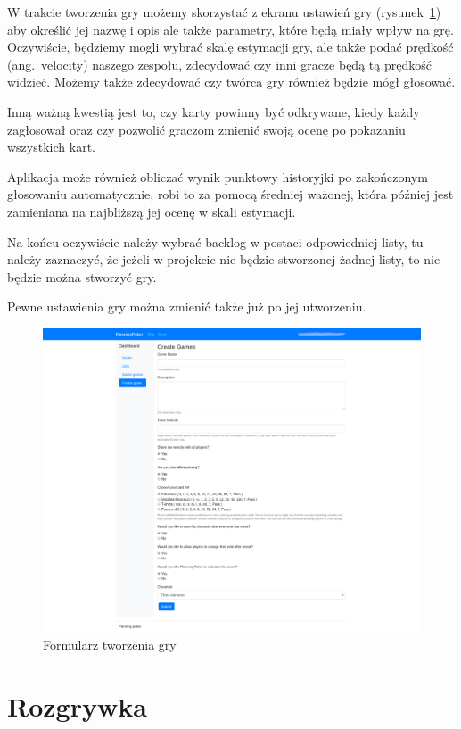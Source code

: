 W trakcie tworzenia gry możemy skorzystać z ekranu ustawień gry (rysunek~\ref{rys:form})
aby określić jej nazwę i opis ale także parametry, które będą miały wpływ na grę.
Oczywiście, będziemy mogli wybrać skalę estymacji gry, ale także podać prędkość (ang.\ velocity)
naszego zespołu, zdecydować czy inni gracze będą tą prędkość widzieć.
Możemy także zdecydować czy twórca gry również będzie mógł głosować.

Inną ważną kwestią jest to, czy karty powinny być odkrywane, kiedy każdy zagłosował
oraz czy pozwolić graczom zmienić swoją ocenę po pokazaniu wszystkich kart.

Aplikacja może również obliczać wynik punktowy historyjki po zakończonym głosowaniu automatycznie,
robi to za pomocą średniej ważonej, która później jest zamieniana na najbliższą jej ocenę w skali estymacji.

Na końcu oczywiście należy wybrać backlog w postaci odpowiedniej listy, tu należy zaznaczyć,
że jeżeli w projekcie nie będzie stworzonej żadnej listy, to nie będzie można stworzyć gry.

Pewne ustawienia gry można zmienić także już po jej utworzeniu.

\begin{figure}[h]
	\centering\includegraphics[width=\textwidth]{img/Formularz}
	\caption{Formularz tworzenia gry}\label{rys:form}%
\end{figure}

\section{Rozgrywka}

